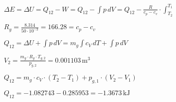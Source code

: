 \( \Delta E = \Delta U = Q_{12} - W = Q_{12} - \int p \, dV = Q_{12} - \frac{R}{c_p - c_v} \cdot \int_{T_2}^{T_1} \)  

\( R_g = \frac{8.314}{50 \cdot 10^{-3}} = 166.28 = c_p - c_v \)  

\( Q_{12} = \Delta U + \int p \, dV = m_g \int c_V \, dT + \int p \, dV \)  

\( V_2 = \frac{m_g \cdot R_g \cdot T_{g,2}}{p_{g,2}} = 0.001103 \, \text{m}^3 \)  

\( Q_{12} = m_g \cdot c_V \cdot (T_2 - T_1) + p_{g,1} \cdot (V_2 - V_1) \)  

\( Q_{12} = -1.082743 - 0.285953 = -1.3673 \, \text{kJ} \)
